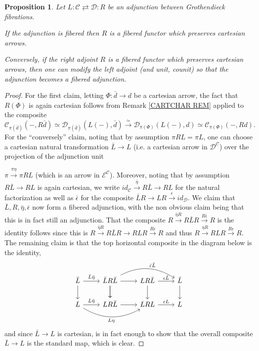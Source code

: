 \documentclass[a4paper,10pt
,draft
]{article}%
\numberwithin{equation}{section}
\numberwithin{figure}{section}
\newtheorem{proposition}[equation]{Proposition}%
\theoremstyle{definition} %
\newcommand{\1}{\ensuremath{\mathbbm 1}}%
\begin{document}
\begin{proposition}\label{FIBADJCAR PROP}
Let $L \colon \mathcal{C} \rightleftarrows \mathcal{D} \colon R$
be an adjunction between Grothendieck fibrations.

If the adjunction is fibered then 
$R$ is 
a fibered functor which preserves cartesian arrows.

Conversely, if the right adjoint $R$ is 
a fibered functor which preserves cartesian arrows, 
then one can modify the left adjoint (and unit, counit)
so that the adjunction becomes a fibered adjunction.
\end{proposition}


\begin{proof}
For the first claim, 
letting $\Phi \colon \bar{d} \to d$ be a cartesian arrow, 
the fact that $R(\Phi)$ is again cartesian follows from
Remark \ref{CARTCHAR REM} applied to the composite
\[
\mathcal{C}_{\pi(\bar{d})}
	\left(-,R\bar{d}\right)
	\simeq 
\mathcal{D}_{\pi(\bar{d})}
	\left(L(-),\bar{d}\right)
	\xrightarrow{\simeq}
\mathcal{D}_{\pi(\Phi)}\left(L(-),d\right)
	\simeq
\mathcal{C}_{\pi(\Phi)}\left(-,Rd\right).
\]
For the ``conversely'' claim,
noting that by assumption $\pi RL = \pi L$,
one can choose a cartesian natural transformation $\bar{L} \to L$
(i.e. a cartesian arrow in $\mathcal{D}^{\mathcal{C}}$)
over the projection of the adjunction unit

$\pi \xrightarrow{\pi \eta} \pi RL$
(which is an arrow in $\mathcal{E}^{\mathcal{C}}$).
Moreover, noting that by assumption
$R\bar{L} \to RL$ is again cartesian, we write
$id_{\mathcal{C}} \xrightarrow{\bar{\eta}} R \bar{L} \to RL$
for the natural factorization
as well as $\bar{\epsilon}$ for the composite
$\bar{L}R \to LR \xrightarrow{\epsilon} id_{\mathcal{D}}$.
We claim that $\bar{L},R,\bar{\eta},\bar{\epsilon}$
now form a fibered adjunction, with the non obvious claim being that this is in fact still an adjunction.
That the composite
$R\xrightarrow{\bar{\eta}R} R\bar{L}R \xrightarrow{R\bar{\epsilon}} R$
is the identity follows since this is 
$R \xrightarrow{\bar{\eta} R} R\bar{L}R \to RLR \xrightarrow{R \epsilon} R$ and thus
$R \xrightarrow{\eta R} RLR \xrightarrow{R \epsilon} R$.
The remaining claim is that the top horizontal composite in the diagram below is the identity, 
\begin{equation}
\begin{tikzcd}
		\bar{L} \arrow[d] \arrow{r}{\bar{L}\bar{\eta}}
	&
		\bar{L} R \bar{L} \arrow[d] \ar{r} \ar{d}
		\arrow[bend left]{rr}{\bar{\epsilon}\bar{L}}
	&
		L R \bar{L} \ar{r}{\epsilon \bar{L}} \ar{d}
	&
		\bar{L} \ar {d}
\\
		L \arrow{r}{L\bar{\eta}}
		\arrow[bend right]{rr}[swap]{L \eta}
	&
		LR\bar{L} \ar{r}
	&
		LRL \ar{r}{\epsilon L}
	&
		L
\end{tikzcd}
\end{equation}
and since 
$\bar{L} \to L$ is cartesian, 
is in fact enough to show that the overall composite $\bar{L} \to L$
is the standard map, which is clear. 
\end{proof}
\end{document}
